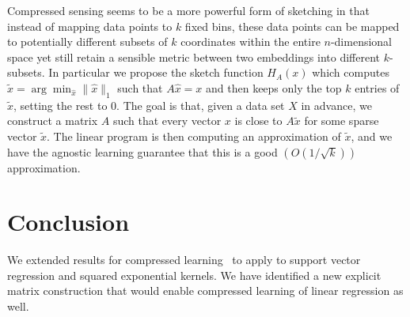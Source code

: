 \documentclass[english]{article}
\theoremstyle{plain}
\begin{document}
Compressed sensing seems to be a more powerful form of sketching in that instead of mapping data points to $k$ fixed bins, these data points can be mapped to potentially different subsets of $k$ coordinates within the entire $n$-dimensional space yet still retain a sensible metric between two embeddings into different $k$-subsets. In particular we propose the sketch function $H_A(x)$ which computes $\tilde{x} = \arg\min_{\hat{x}} \|\hat{x}\|_1$ such that $A\hat{x}=x$ and then keeps only the top $k$ entries of $\tilde{x}$, setting the rest to $0$. The goal is that, given a data set $X$ in advance, we construct a matrix $A$ such that every vector $x$ is close to $A\tilde{x}$ for some sparse vector $\tilde{x}$. The linear program is then computing an approximation of $\tilde{x}$, and we have the agnostic learning guarantee that this is a good $\left(O(1/\sqrt{k})\right)$ approximation. 

\section{Conclusion}
We extended results for compressed learning~\citep{Calderbank2009} to apply to support vector regression and squared exponential kernels. We have identified a new explicit matrix construction that would enable compressed learning of linear regression as well.



\end{document}

